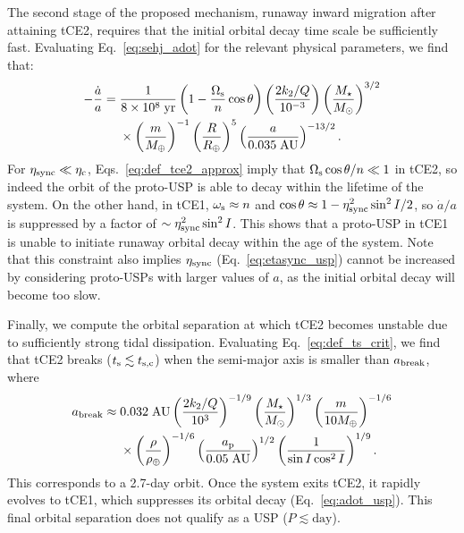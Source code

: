 \documentclass[
        fleqn,
        usenatbib,
        referee,
    ]{mnras}
\newcommand*{\p}[1]{\left(#1\right)}
\begin{document}
The second stage of the proposed mechanism, runaway inward migration after
attaining tCE2, requires that the initial orbital decay time scale be
sufficiently fast. Evaluating Eq.~\eqref{eq:sehj_adot} for the relevant physical
parameters, we find that:
\begin{align}
    -\frac{\dot{a}}{a} ={}& \frac{1}{8 \times 10^8\;\mathrm{yr}}
            \p{1 - \frac{\Omega_{\rm s}}{n}\cos \theta}
            \p{\frac{2k_2/Q}{10^{-3}}}
            \p{\frac{M_\star}{M_{\odot}}}^{3/2}\nonumber\\
        &\times \p{\frac{m}{M_{\oplus}}}^{-1}
            \p{\frac{R}{R_{\oplus}}}^5
            \p{\frac{a}{0.035\;\mathrm{AU}}}^{-13/2}.
            \label{eq:adot_usp}
\end{align}
For $\eta_{\rm sync} \ll \eta_{\rm c}$, Eqs.~\eqref{eq:def_tce2_approx} imply
that $\Omega_{\rm s}\cos \theta / n \ll 1$ in tCE2, so indeed the orbit of the
proto-USP is able to decay within the lifetime of the system. On the other hand,
in tCE1, $\omega_{\rm s} \approx n$ and $\cos \theta \approx 1 - \eta_{\rm
sync}^2 \sin^2 I / 2$, so $\dot{a} / a$ is suppressed by a factor of $\sim
\eta_{\rm sync}^2 \sin^2 I$. This shows that a proto-USP in tCE1 is unable to
initiate runaway orbital decay within the age of the system. Note that this
constraint also implies $\eta_{\rm sync}$ (Eq.~\ref{eq:etasync_usp}) cannot be
increased by considering proto-USPs with larger values of $a$, as the initial
orbital decay will become too slow.

Finally, we compute the orbital separation at which tCE2 becomes unstable due to
sufficiently strong tidal dissipation. Evaluating Eq.~\eqref{eq:def_ts_crit}, we
find that tCE2 breaks ($t_{\rm s} \lesssim t_{\rm s, c}$) when the semi-major
axis is smaller than $a_{\rm break}$, where
\begin{align}
    a_{\rm break} \approx{}& 0.032 \;\mathrm{AU}
        \p{\frac{2k_2/Q}{10^{3}}}^{-1/9}
        \p{\frac{M_\star}{M_{\odot}}}^{1/3}
        \p{\frac{m}{10M_{\oplus}}}^{-1/6}\nonumber\\
        &\times \p{\frac{\rho}{\rho_{\oplus}}}^{-1/6}
        \p{\frac{a_{\rm p}}{0.05\;\mathrm{AU}}}^{1/2}
        \p{\frac{1}{\sin I \cos^2 I}}^{1/9}.
\end{align}
This corresponds to a 2.7-day orbit. Once the system exits tCE2, it rapidly
evolves to tCE1, which suppresses its orbital decay (Eq.~\ref{eq:adot_usp}).
This final orbital separation does not qualify as a USP ($P \lesssim
\mathrm{day}$).
\end{document}
